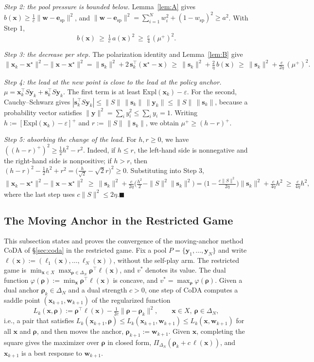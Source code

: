 \documentclass{article}
\theoremstyle{plain}
\theoremstyle{remark}
\newcommand{\Expl}{\mathrm{Expl}}
\newcommand{\Proj}{\Pi}
\newcommand{\simplex}{\Delta}
\newcommand{\bx}{{\bm{x}}}
\newcommand{\by}{{\bm{y}}}
\newcommand{\bw}{{\bm{w}}}
\newcommand{\be}{{\bm{e}}}
\newcommand{\brho}{{\bm{\rho}}}
\newcommand{\bell}{{\bm{\ell}}}
\newcommand{\xs}{\bx^{\star}}
\newcommand{\dx}{{\bm{s}}}
\newcommand{\esp}{\be_{\mathrm{sp}}}
\newcommand{\wsp}{w_{\mathrm{sp}}}
\newcommand{\coda}{CoDA}
\begin{document}
\textit{Step 2: the pool pressure is bounded below.} Lemma~\ref{lem:A} gives $b(\bx)\ge\tfrac1c\|\bw-\esp\|^2$, and $\|\bw-\esp\|^2=\sum_{i=1}^Nw_i^2+(1-\wsp)^2\ge a^2$. With Step 1,
\[
b(\bx)\ \ge\ \tfrac1c\,a(\bx)^2\ \ge\ \tfrac c4\,(\mu^+)^2 .
\]

\textit{Step 3: the decrease per step.} The polarization identity and Lemma~\ref{lem:B} give
\[
\|\bx_k-\xs\|^2-\|\bx-\xs\|^2=\|\dx_k\|^2+2\,\dx_k^\top(\xs-\bx)\ \ge\ \|\dx_k\|^2+\tfrac2\eta\,b(\bx)\ \ge\ \|\dx_k\|^2+\tfrac{c}{2\eta}\,(\mu^+)^2 .
\]

\textit{Step 4: the lead at the new point is close to the lead at the policy anchor.} $\mu=\bx_k^\top S\by_k+\dx_k^\top S\by_k$. The first term is at least $\Expl(\bx_k)-\varepsilon$. For the second, Cauchy--Schwarz gives $|\dx_k^\top S\by_k|\le\|S\|\,\|\dx_k\|\,\|\by_k\|\le\|S\|\,\|\dx_k\|$, because a probability vector satisfies $\|\by\|^2=\sum_iy_i^2\le\sum_iy_i=1$. Writing $h:=[\Expl(\bx_k)-\varepsilon]^+$ and $r:=\|S\|\,\|\dx_k\|$, we obtain $\mu^+\ge(h-r)^+$.

\textit{Step 5: absorbing the change of the lead.} For $h,r\ge0$, we have $((h-r)^+)^2\ge\tfrac12h^2-r^2$. Indeed, if $h\le r$, the left-hand side is nonnegative and the right-hand side is nonpositive; if $h>r$, then $(h-r)^2-\tfrac12h^2+r^2=\big(\tfrac{h}{\sqrt2}-\sqrt2r\big)^2\ge0$. Substituting into Step 3,
\[
\|\bx_k-\xs\|^2-\|\bx-\xs\|^2\ \ge\ \|\dx_k\|^2+\tfrac{c}{2\eta}\Big(\tfrac{h^2}2-\|S\|^2\|\dx_k\|^2\Big)=\Big(1-\tfrac{c\|S\|^2}{2\eta}\Big)\|\dx_k\|^2+\tfrac{c}{4\eta}h^2\ \ge\ \tfrac{c}{4\eta}h^2 ,
\]
where the last step uses $c\|S\|^2\le2\eta$.\hfill$\blacksquare$

\subsection{The Moving Anchor in the Restricted Game}
\label{app:coda}

This subsection states and proves the convergence of the moving-anchor method \coda{} of \S\ref{sec:coda} in the restricted game. Fix a pool $P=\{\by_1,\dots,\by_N\}$ and write $\bell(\bx):=(\ell_1(\bx),\dots,\ell_N(\bx))$, without the self-play arm. The restricted game is $\min_{\bx\in X}\max_{\brho\in\simplex_N}\brho^\top\bell(\bx)$, and $v^*$ denotes its value. The dual function $\varphi(\brho):=\min_\bx\brho^\top\bell(\bx)$ is concave, and $v^*=\max_\brho\varphi(\brho)$. Given a dual anchor $\brho_k\in\simplex_N$ and a dual strength $c>0$, one step of \coda{} computes a saddle point $(\bx_{k+1},\bw_{k+1})$ of the regularized function
\begin{equation}
L_k(\bx,\brho):=\brho^\top\bell(\bx)-\tfrac1{2c}\|\brho-\brho_k\|^2 ,\qquad \bx\in X,\ \brho\in\simplex_N,
\label{eq:coda}
\end{equation}
i.e., a pair that satisfies $L_k(\bx_{k+1},\brho)\le L_k(\bx_{k+1},\bw_{k+1})\le L_k(\bx,\bw_{k+1})$ for all $\bx$ and $\brho$, and then moves the anchor, $\brho_{k+1}:=\bw_{k+1}$. Given $\bx$, completing the square gives the maximizer over $\brho$ in closed form, $\Proj_{\simplex_N}(\brho_k+c\,\bell(\bx))$, and $\bx_{k+1}$ is a best response to $\bw_{k+1}$.
\end{document}
